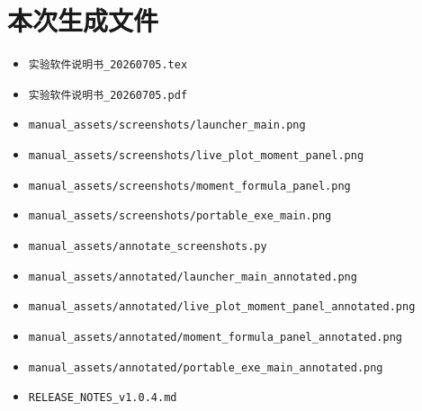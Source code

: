 \documentclass[11pt,a4paper]{ctexart}
\begin{document}
\section{本次生成文件}

\begin{itemize}[leftmargin=2em]
  \item \texttt{实验软件说明书\_20260705.tex}
  \item \texttt{实验软件说明书\_20260705.pdf}
  \item \texttt{manual\_assets/screenshots/launcher\_main.png}
  \item \texttt{manual\_assets/screenshots/live\_plot\_moment\_panel.png}
  \item \texttt{manual\_assets/screenshots/moment\_formula\_panel.png}
  \item \texttt{manual\_assets/screenshots/portable\_exe\_main.png}
  \item \texttt{manual\_assets/annotate\_screenshots.py}
  \item \texttt{manual\_assets/annotated/launcher\_main\_annotated.png}
  \item \texttt{manual\_assets/annotated/live\_plot\_moment\_panel\_annotated.png}
  \item \texttt{manual\_assets/annotated/moment\_formula\_panel\_annotated.png}
  \item \texttt{manual\_assets/annotated/portable\_exe\_main\_annotated.png}
  \item \texttt{RELEASE\_NOTES\_v1.0.4.md}
\end{itemize}
\end{document}
